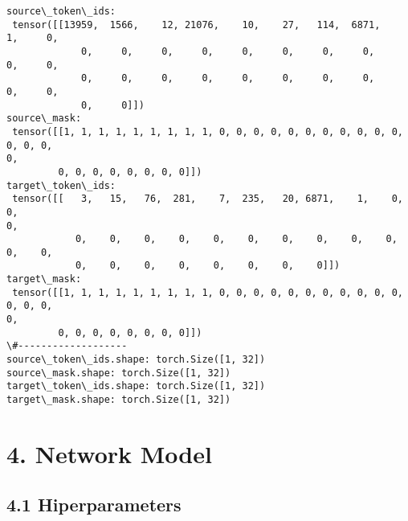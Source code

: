 \documentclass[10pt]{article}
\begin{document}
    \begin{Verbatim}[commandchars=\\\{\}]
source\_token\_ids:
 tensor([[13959,  1566,    12, 21076,    10,    27,   114,  6871,     1,     0,
             0,     0,     0,     0,     0,     0,     0,     0,     0,     0,
             0,     0,     0,     0,     0,     0,     0,     0,     0,     0,
             0,     0]])
source\_mask:
 tensor([[1, 1, 1, 1, 1, 1, 1, 1, 1, 0, 0, 0, 0, 0, 0, 0, 0, 0, 0, 0, 0, 0, 0,
0,
         0, 0, 0, 0, 0, 0, 0, 0]])
target\_token\_ids:
 tensor([[   3,   15,   76,  281,    7,  235,   20, 6871,    1,    0,    0,
0,
            0,    0,    0,    0,    0,    0,    0,    0,    0,    0,    0,    0,
            0,    0,    0,    0,    0,    0,    0,    0]])
target\_mask:
 tensor([[1, 1, 1, 1, 1, 1, 1, 1, 1, 0, 0, 0, 0, 0, 0, 0, 0, 0, 0, 0, 0, 0, 0,
0,
         0, 0, 0, 0, 0, 0, 0, 0]])
\#-------------------
source\_token\_ids.shape: torch.Size([1, 32])
source\_mask.shape: torch.Size([1, 32])
target\_token\_ids.shape: torch.Size([1, 32])
target\_mask.shape: torch.Size([1, 32])
    \end{Verbatim}

    \hypertarget{network-model}{%
\section*{4. Network Model}\label{network-model}}

    \hypertarget{hiperparameters}{%
\subsection*{4.1 Hiperparameters}\label{hiperparameters}}
\end{document}
